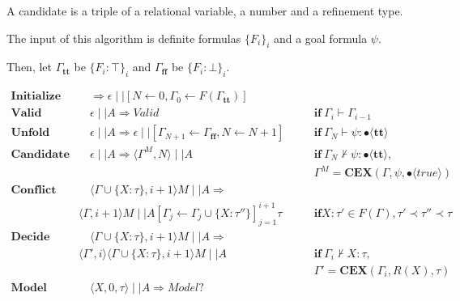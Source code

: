 \documentclass[runningheads]{llncs}
\newcommand\COL{\mathbin{:}}
\newcommand \true {\textbf{tt}}
\newcommand \false {\textbf{ff}}
\newcommand \stypebool {\bullet}
\newcommand \typebool[1]{\stypebool \langle #1 \rangle}
\begin{document}
A candidate is a triple of a relational variable, a number and a refinement type.

The input of this algorithm is definite formulas \(\{F_i\}_i\) and a goal formula
\(\psi\).

Then, let \( \Gamma_\true \) be \( \{F_i: \top\}_i \)
and \( \Gamma_\false \) be \( \{F_i: \bot \}_i \).

\begin{align*}
    \textbf{Initialize} &\quad
        \Longrightarrow
        \epsilon \mid \mid [N \leftarrow 0, \Gamma_0 \leftarrow F(\Gamma_\true)]
        &&\\
    \textbf{Valid} &\quad
        \epsilon \mid \mid A \Longrightarrow \textit{Valid}
        &&\quad \textbf{if} \ \Gamma_{i} \vdash \Gamma_{i-1}
        \\
    \textbf{Unfold} &\quad
        \epsilon \mid \mid A \Longrightarrow
        \epsilon \mid \mid [\Gamma_{N+1} \leftarrow \Gamma_\false, N \leftarrow N + 1]
        &&\quad \textbf{if} \ \Gamma_{N} \vdash \psi: \typebool{\true}
        \\
    \textbf{Candidate} &\quad
        \epsilon \mid \mid A
        \Longrightarrow
        \langle \Gamma^M, N \rangle \mid \mid A
        && \quad \textbf{if} \ \Gamma_N \not \vdash \psi \COL
        \typebool{\true},\\
        &&&\quad \Gamma^M = \textbf{CEX}(\Gamma, \psi, \typebool{true})
        \\
    \textbf{Conflict} &\quad
        \langle \Gamma \cup \{X: \tau\}, i + 1 \rangle M\mid \mid A
        \Longrightarrow&&\\
        & \langle \Gamma, i+1 \rangle M
        \mid \mid A[\Gamma_j \leftarrow \Gamma_j \cup \{X: \tau''\}]_{j=1}^{i+1}
        \tau
        &&\quad \textbf{if} X: \tau' \in F(\Gamma), \tau' \prec \tau''
        \prec \tau
        \\
    \textbf{Decide} &\quad
        \langle \Gamma \cup \{X: \tau\}, i + 1 \rangle M\mid \mid A
        \Longrightarrow&&\\
        & \langle \Gamma', i \rangle \langle \Gamma \cup \{X: \tau\}, i+1 \rangle M
        \mid \mid A
        &&\quad \textbf{if} \ \Gamma_i \not\vdash X \COL \tau,\\
        &&&\quad \Gamma' = \textbf{CEX}(\Gamma_i, R(X), \tau)
        \\
    \textbf{Model} &\quad
        \langle X, 0, \tau \rangle \mid \mid A \Rightarrow Model?
        &&\\
\end{align*}
\end{document}

